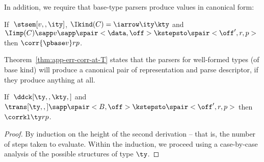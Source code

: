 In addition, we require that base-type parsers produce values in canonical form:
\begin{condition}
  \label{cond:base-types-cf}
  If $\;\stsem[v,,\ity]$, $\Ikind(C) = \iarrow \ity \kty$ and $\Iimp(C)
  \sapp v \sapp \spair<\data,\off> \kstepsto \spair<\off',r,p>$ then
  $\corr {\pbase v} r p $.
\end{condition}

Theorem~\ref{thm:app-err-corr-at-T} states that the parsers for
well-formed types (of base kind) will produce a canonical pair of
representation and parse descriptor, if they produce anything at all.

\begin{theorem}
\label{thm:app-err-corr-at-T}
If $\; \ddck[\ty,,\kty,]$ and $\trans[\ty,,] \sapp \spair<B,\off> \kstepsto
  \spair<\off',r,p>$ then $\corrkl \ty r p$.
\end{theorem}

\begin{proof}
  By induction on the height of the second derivation -- that is, the
  number of steps taken to evaluate. Within the induction, we proceed
  using a case-by-case analysis of the possible structures of type
  $\ty$.  
\end{proof}






